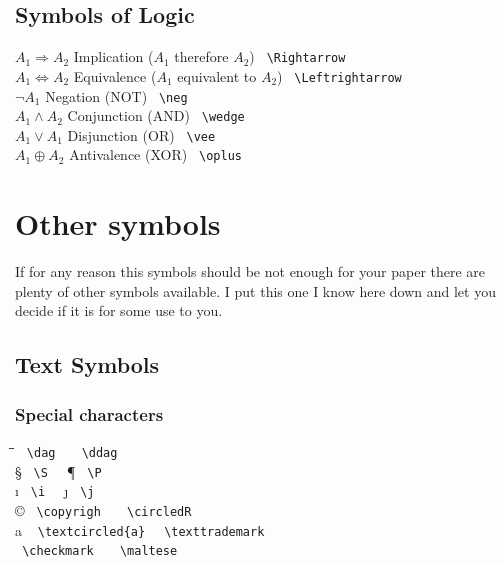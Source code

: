 \subsection{Symbols of Logic}
\begin{tabbing}
\mySymbols
$ A_1 \Rightarrow A_2 $    \>  Implication ($A_1$ therefore $A_2$)     \> \verb` \Rightarrow `  \\
$ A_1 \Leftrightarrow A_2 $\>  Equivalence ($A_1$ equivalent to $A_2$) \> \verb` \Leftrightarrow `  \\
$ \neg A_1 $               \>  Negation (NOT)          \> \verb` \neg `  \\
$ A_1 \wedge A_2 $         \>  Conjunction (AND)       \> \verb` \wedge `  \\
$ A_1 \vee A_1 $           \>  Disjunction (OR)        \> \verb` \vee `  \\
$ A_1 \oplus A_2 $         \>  Antivalence (XOR)       \> \verb` \oplus `  \\
\end{tabbing}

\section{Other symbols}
\newcommand{\mySymbolss}{\hspace*{0.1\textwidth}\=\hspace*{0.4\textwidth}\=\hspace*{0.1\textwidth}\=\hspace*{0.3\textwidth}\kill}


If for any reason this symbols should be not enough for your paper there are plenty of other symbols available. I put this one I know here down and let you decide if it is for some use to you.
\subsection{Text Symbols}
\subsubsection{Special characters}
\begin{tabbing}
\mySymbolss
\dag   \>  \verb` \dag  ` \> \ddag   \>  \verb` \ddag `  \\
\S   \>  \verb` \S  ` \> \P   \>  \verb` \P `  \\
\i   \>  \verb` \i  ` \> \j  \>  \verb` \j `  \\
\copyright \> \verb` \copyrigh  ` \> \circledR  \>  \verb` \circledR `  \\
\textcircled{a} \> \verb` \textcircled{a} ` \> \texttrademark  \>  \verb` \texttrademark `  \\
\checkmark   \>  \verb` \checkmark  ` \> \maltese  \>  \verb` \maltese `  \\
\end{tabbing}
